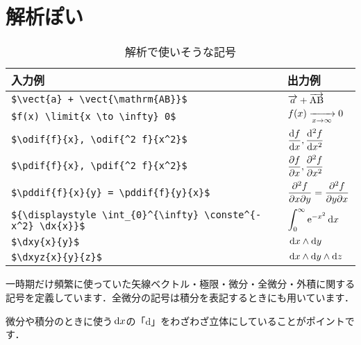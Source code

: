 \documentclass[uplatex]{jsreport}
\begin{document}
\section{解析ぽい}
\begin{table}[htbp]
  \centering
  \caption{解析で使いそうな記号}
  \label{table:2.vectlimit}
  \renewcommand{\arraystretch}{1.5}
  \begin{tabular}{ll}\hline
    入力例 & 出力例 \\ \hline
    \verb|$\vect{a} + \vect{\mathrm{AB}}$| & $\overrightarrow{a} + \overrightarrow{\mathrm{AB}}$ \\
    \verb|$f(x) \limit{x \to \infty} 0$| & $f(x) \xrightarrow[x \to \infty]{} 0$ \\
    \verb|$\odif{f}{x}, \odif{^2 f}{x^2}$| & $\dfrac{\mathrm{d}f}{\mathrm{d}x}, \dfrac{\mathrm{d}^2 f}{\mathrm{d}x^2}$ \\
    \verb|$\pdif{f}{x}, \pdif{^2 f}{x^2}$| & $\dfrac{\partial f}{\partial x}, \dfrac{\partial ^2 f}{\partial x^2}$ \\
    \verb|$\pddif{f}{x}{y} = \pddif{f}{y}{x}$| & $\dfrac{\partial^{2} f}{\partial x \partial y} = \dfrac{\partial^{2} f}{\partial y \partial x}$ \\
    \verb|${\displaystyle \int_{0}^{\infty} \conste^{-x^2} \dx{x}}$| & ${\displaystyle \int_{0}^{\infty} \mathrm{e}^{-x^2} \,\mathrm{d}x}$ \\
    \verb|$\dxy{x}{y}$| & $\,\mathrm{d}x \wedge \mathrm{d}y$ \\
    \verb|$\dxyz{x}{y}{z}$| & $\,\mathrm{d}x \wedge \mathrm{d}y \wedge \mathrm{d}z$ \\ \hline
  \end{tabular}\par
\end{table}\par
一時期だけ頻繁に使っていた矢線ベクトル・極限・微分・全微分・外積に関する記号を定義しています．全微分の記号は積分を表記するときにも用いています．\par
微分や積分のときに使う$\,\mathrm{d}x$の「d」をわざわざ立体にしていることがポイントです．
\par
\end{document}
